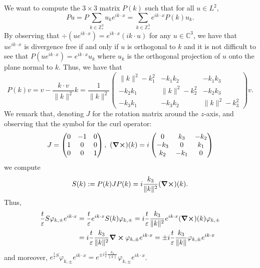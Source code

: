 \documentclass[]{article}
\theoremstyle{definition}
\theoremstyle{definition}
\let\phi\varphi
\let\epsilon\varepsilon
\begin{document}
We want to compute the \(3 \times 3\) matrix \(P(k)\) such that for all \(u \in L^2\), 
\[Pu = P \sum_{k \in \mathbb{Z}^3_*} u_k e^{ik \cdot x} = \sum_{k \in \mathbb{Z}^3_*} e^{ik \cdot x} P(k) u_k.\]
By observing that \(\div(u e^{ik \cdot x}) = e^{ik \cdot x} (ik \cdot u)\) for any \(u \in \mathbb{C}^3\), 
we have that \(u e^{ik \cdot x}\) is divergence free if and only if \(u\) is orthogonal to \(k\) 
and it is not difficult to see that \(P(u e^{ik \cdot x}) = e^{ik \cdot x} u_k\) where \(u_k\) is the 
orthogonal projection of \(u\) onto the plane normal to \(k\). Thus, we have that 
\[P(k)v = v - \frac{k \cdot v}{\|k\|^2}k = \frac{1}{\|k\|^2}\begin{pmatrix}
  \|k\|^2 - k_1^2 & -k_1 k_2 & -k_1 k_3\\
  -k_2 k_1 & \|k\|^2 - k_2^2 & -k_2 k_3\\
  -k_3 k_1 & -k_3 k_2 & \|k\|^2 - k_3^2
\end{pmatrix}v.\]
We remark that, denoting \(J\) for the rotation matrix around the \(z\)-axis, and observing that 
the symbol for the curl operator:
\[J = \begin{pmatrix}
  0 & -1 & 0\\
  1 & 0 & 0\\
  0 & 0 & 1
\end{pmatrix}, \
(\curl)(k) = i\begin{pmatrix}
  0 & k_3 & -k_2\\
  -k_3 & 0 & k_1\\
  k_2 & -k_1 & 0
\end{pmatrix}\]
we compute 
\[S(k) := P(k)JP(k) = i\frac{k_3}{\|k\|^2}(\curl)(k).\]
Thus, 
\begin{align*}
  \frac{t}{\epsilon}S \phi_{k, \pm} e^{ik \cdot x} 
  & = \frac{t}{\epsilon} e^{ik \cdot x} S(k) \phi_{k, \pm} 
    = i\frac{t}{\epsilon}\frac{k_3}{\|k\|^2} e^{ik \cdot x} (\curl)(k)\phi_{k, \pm}\\
  & = i\frac{t}{\epsilon}\frac{k_3}{\|k\|^2} \curl{\phi_{k, \pm} e^{ik \cdot x}} 
    = \pm i\frac{t}{\epsilon}\frac{k_3}{\|k\|} \phi_{k, \pm} e^{ik \cdot x}
\end{align*}
and moreover, \(e^{\frac{t}{\epsilon}S} \phi_{k, \pm} e^{ik \cdot x} 
  = e^{\pm i\frac{t}{\epsilon}\frac{k_3}{\|k\|}} \phi_{k, \pm} e^{ik \cdot x}\).




\end{document}
